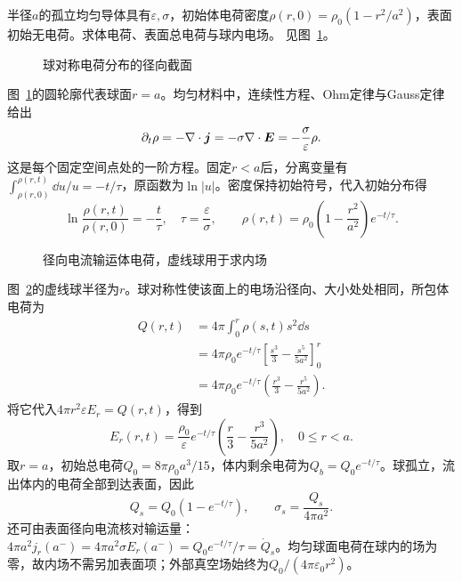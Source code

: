 \begin{exercise}[非均匀体电荷的弛豫]\label{ex:i3-h2}
半径$a$的孤立均匀导体具有$\varepsilon,\sigma$，初始体电荷密度$\rho(r,0)=\rho_0(1-r^2/a^2)$，表面初始无电荷。求体电荷、表面总电荷与球内电场。 见图~\ref{fig:i3-h2-q}。
\end{exercise}

\begin{figure}[H]\centering
{}
\caption{球对称电荷分布的径向截面}\label{fig:i3-h2-q}
\end{figure}
\begin{solution}
图~\ref{fig:i3-h2-q}的圆轮廓代表球面$r=a$。均匀材料中，连续性方程、Ohm定律与Gauss定律给出
\[
\partial_t\rho=-\nabla\cdot\bm{j}
=-\sigma\nabla\cdot\bm{E}=-\frac{\sigma}{\varepsilon}\rho.
\]
这是每个固定空间点处的一阶方程。固定$r<a$后，分离变量有$\int_{\rho(r,0)}^{\rho(r,t)}\dd u/u=-t/\tau$，原函数为$\ln|u|$。密度保持初始符号，代入初始分布得
\[
\ln\frac{\rho(r,t)}{\rho(r,0)}=-\frac t\tau,\quad
\tau=\frac{\varepsilon}{\sigma},\qquad
\rho(r,t)=\rho_0\left(1-\frac{r^2}{a^2}\right)e^{-t/\tau}.
\]
\begin{figure}[H]\centering
{}
\caption{径向电流输运体电荷，虚线球用于求内场}\label{fig:i3-h2-s}
\end{figure}
图~\ref{fig:i3-h2-s}的虚线球半径为$r$。球对称性使该面上的电场沿径向、大小处处相同，所包体电荷为
\[
\begin{aligned}
Q(r,t)&=4\pi\int_0^r\rho(s,t)s^2\dd s\\
&=4\pi\rho_0e^{-t/\tau}
\left[\frac{s^3}{3}-\frac{s^5}{5a^2}\right]_0^r\\
&=4\pi\rho_0e^{-t/\tau}
\left(\frac{r^3}{3}-\frac{r^5}{5a^2}\right).
\end{aligned}
\]
将它代入$4\pi r^2\varepsilon E_r=Q(r,t)$，得到
\[
\boxed{E_r(r,t)=\frac{\rho_0}{\varepsilon}e^{-t/\tau}
\left(\frac r3-\frac{r^3}{5a^2}\right)},\quad 0\le r<a.
\]
取$r=a$，初始总电荷$Q_0=8\pi\rho_0a^3/15$，体内剩余电荷为$Q_b=Q_0e^{-t/\tau}$。球孤立，流出体内的电荷全部到达表面，因此
\[
\boxed{Q_s=Q_0(1-e^{-t/\tau})},\qquad
\sigma_s=\frac{Q_s}{4\pi a^2}.
\]
还可由表面径向电流核对输运量：
$4\pi a^2j_r(a^-)=4\pi a^2\sigma E_r(a^-)=Q_0e^{-t/\tau}/\tau=\dot Q_s$。均匀球面电荷在球内的场为零，故内场不需另加表面项；外部真空场始终为$Q_0/(4\pi\varepsilon_0r^2)$。
\end{solution}

